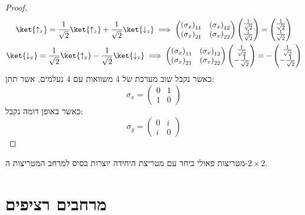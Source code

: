 \documentclass{tstextbook}
\begin{document}
\begin{proof}
\begin{gather*}\ket{\uparrow_{x}} = \frac{1}{\sqrt{ 2 }}\ket{\uparrow_{z}} +\frac{1}{\sqrt{ 2 }}\ket{\downarrow_{z}} \implies \begin{pmatrix}\left( \sigma_{x} \right)_{11} & \left( \sigma_{x} \right)_{12} \\\left( \sigma_{x} \right)_{21} & \left( \sigma_{x} \right)_{22}\end{pmatrix}\begin{pmatrix}\frac{1}{\sqrt{ 2 }} \\\frac{1}{\sqrt{ 2 }}\end{pmatrix}=\begin{pmatrix}\frac{1}{\sqrt{ 2 }} \\\frac{1}{\sqrt{ 2 }}\end{pmatrix} \\\ket{\downarrow_{x}} = \frac{1}{\sqrt{ 2 }}\ket{\uparrow_{z}} -\frac{1}{\sqrt{ 2 }}\ket{\downarrow_{z}} \implies \begin{pmatrix}\left( \sigma_{x} \right)_{11} & \left( \sigma_{x} \right)_{12} \\\left( \sigma_{x} \right)_{21} & \left( \sigma_{x} \right)_{22}\end{pmatrix}\begin{pmatrix}\frac{1}{\sqrt{ 2 }} \\-\frac{1}{\sqrt{ 2 }}\end{pmatrix}=-\begin{pmatrix}\frac{1}{\sqrt{ 2 }} \\-\frac{1}{\sqrt{ 2 }}\end{pmatrix} 
\end{gather*}
כאשר נקבל שוב מערכת של 4 משוואות עם 4 נעלמים, אשר תתן:
$$\sigma_{x}=\begin{pmatrix}0 & 1 \\1 & 0
\end{pmatrix}$$
כאשר באופן דומה נקבל:
$$\sigma_{y}=\begin{pmatrix}0 & i \\i & 0
\end{pmatrix}$$

\end{proof}
\begin{remark}
מטריצות פאולי ביחד עם מטריצת היחידה יוצרות בסיס למרחב המטריצות ה-\(2\times 2\).

\end{remark}
\section{מרחבים רציפים}
\end{document}
